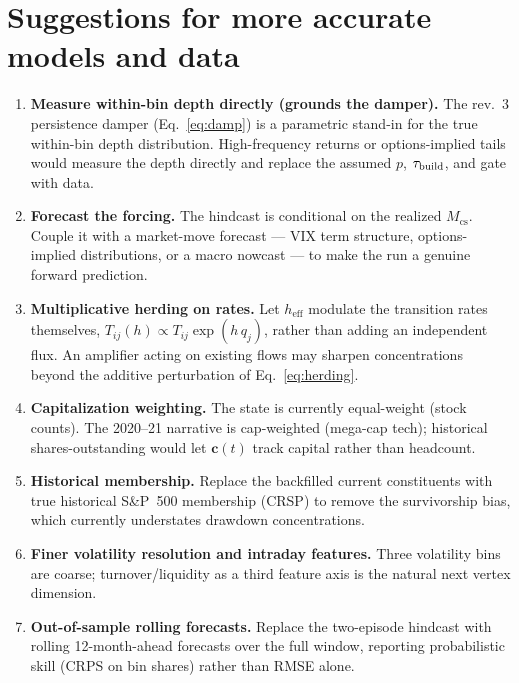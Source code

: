 \documentclass[11pt,a4paper]{article}
\begin{document}
\section{Suggestions for more accurate models and data}
\begin{enumerate}
\item \textbf{Measure within-bin depth directly (grounds the damper).} The
  rev.~3 persistence damper (Eq.~\eqref{eq:damp}) is a parametric stand-in
  for the true within-bin depth distribution.  High-frequency returns or
  options-implied tails would measure the depth directly and replace the
  assumed $p$, $\tau_{\rm build}$, and gate with data.
\item \textbf{Forecast the forcing.} The hindcast is conditional on the
  realized $M_{\mathrm{cs}}$.  Couple it with a market-move forecast ---
  VIX term structure, options-implied distributions, or a macro nowcast ---
  to make the run a genuine forward prediction.
\item \textbf{Multiplicative herding on rates.} Let $h_{\mathrm{eff}}$
  modulate the transition rates themselves,
  $T_{ij}(h)\propto T_{ij}\exp(h\,q_j)$, rather than adding an independent
  flux.  An amplifier acting on existing flows may sharpen concentrations
  beyond the additive perturbation of Eq.~\eqref{eq:herding}.
\item \textbf{Capitalization weighting.} The state is currently equal-weight
  (stock counts).  The 2020--21 narrative is cap-weighted (mega-cap tech);
  historical shares-outstanding would let $\mathbf{c}(t)$ track capital
  rather than headcount.
\item \textbf{Historical membership.} Replace the backfilled current
  constituents with true historical S\&P~500 membership (CRSP) to remove the
  survivorship bias, which currently understates drawdown concentrations.
\item \textbf{Finer volatility resolution and intraday features.} Three
  volatility bins are coarse; turnover/liquidity as a third feature axis is
  the natural next vertex dimension.
\item \textbf{Out-of-sample rolling forecasts.} Replace the two-episode
  hindcast with rolling 12-month-ahead forecasts over the full window,
  reporting probabilistic skill (CRPS on bin shares) rather than RMSE alone.
\end{enumerate}

\end{document}

